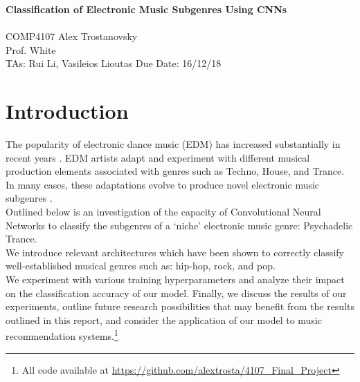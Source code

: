 \documentclass[12pt]{article}
\newcounter{ct}
\begin{document}
\noindent
\large\textbf{Classification of Electronic Music Subgenres Using CNNs}\\ 
 \\
\normalsize COMP4107 \hfill Alex Trostanovsky \\
Prof. White \hfill \\
TAs: Rui Li, Vasileios Lioutas \hfill Due Date: 16/12/18



\section*{Introduction}

The popularity of electronic dance music (EDM) has increased substantially in 
recent years 
\cite{c1}. EDM artists
adapt and experiment with 
different musical production elements associated with genres 
such as Techno, House, and Trance. In many cases, these
adaptations evolve to produce novel electronic music subgenres \cite{c2}\cite{c3}.\\
Outlined below is an investigation of the capacity of Convolutional Neural
Networks to classify the subgenres of a `niche' electronic
music genre: Psychadelic Trance. \\ We introduce relevant architectures 
which have been shown to correctly classify well-established musical 
genres such as: hip-hop, rock, and pop.\\
We experiment with various training hyperparameters and analyze their
impact on the classification accuracy of our model. Finally,
we discuss the results of our experiments, outline 
future research possibilities that may benefit from the results outlined 
in this report, and consider the application
of our model to music recommendation systems.\footnote{All code available at
\href{https://github.com/alextrosta/4107_Final_Project}
{https://github.com/alextrosta/4107\_Final\_Project}
}
\end{document}

